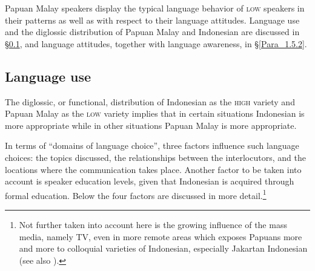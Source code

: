 Papuan Malay speakers display the typical language behavior of \textsc{low} speakers in their  patterns as well as with respect to their language attitudes. Language use and the diglossic distribution of Papuan Malay and Indonesian are discussed in §\ref{Para_1.5.1}, and language attitudes, together with language awareness, in §\ref{Para_1.5.2}.


\subsection{Language use}\label{Para_1.5.1}
The diglossic, or functional, distribution of Indonesian as the \textsc{high} variety and Papuan Malay as the \textsc{low} variety implies that in certain situations Indonesian is more appropriate while in other situations Papuan Malay is more appropriate.



In terms of   ``domains of language choice'', three factors influence such language choices: the topics discussed, the relationships between the interlocutors, and the locations where the communication takes place. Another factor to be taken into account is speaker education levels, given that Indonesian is acquired through formal education. Below the four factors are discussed in more detail.\footnote{Not further taken into account here is the growing influence of the mass media, namely TV, even in more remote areas which exposes Papuans more and more to colloquial varieties of Indonesian, especially Jakartan Indonesian (see also \citealt{Sneddon.2006}).}

